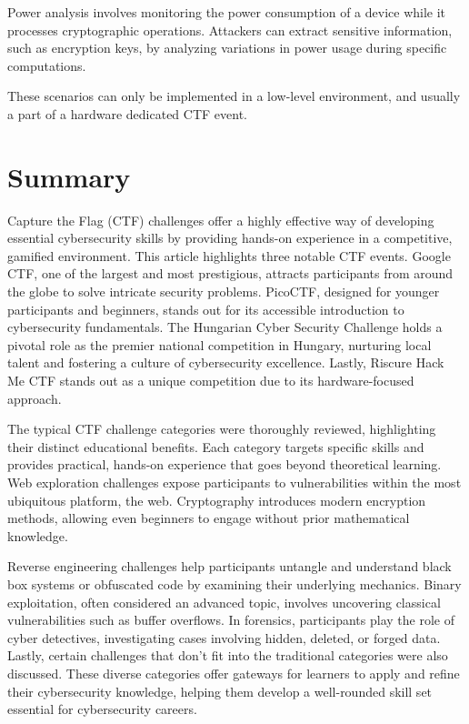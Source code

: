 \documentclass[conference]{IEEEtran}
\begin{document}
Power analysis involves monitoring the power consumption of a device while it
processes cryptographic operations. Attackers can extract sensitive
information, such as encryption keys, by analyzing variations in power usage
during specific computations.

These scenarios can only be implemented in a low-level environment, 
and usually a part of a hardware dedicated CTF event.

\section{Summary}

Capture the Flag (CTF) challenges offer a highly effective way of developing
essential cybersecurity skills by providing hands-on experience in a
competitive, gamified environment. This article highlights three notable CTF
events. Google CTF, one of the largest and most prestigious, attracts
participants from around the globe to solve intricate security problems.
PicoCTF, designed for younger participants and beginners, stands out for its
accessible introduction to cybersecurity fundamentals. The Hungarian Cyber
Security Challenge holds a pivotal role as the premier national competition in
Hungary, nurturing local talent and fostering a culture of cybersecurity
excellence. Lastly, Riscure Hack Me CTF stands out as a unique competition due
to its hardware-focused approach. 

The typical CTF challenge categories were thoroughly reviewed, highlighting
their distinct educational benefits. Each category targets specific skills and
provides practical, hands-on experience that goes beyond theoretical learning.
Web exploration challenges expose participants to
vulnerabilities within the most ubiquitous platform, the web.
Cryptography introduces modern encryption methods, allowing even beginners to
engage without prior mathematical knowledge.

Reverse engineering challenges help participants untangle and understand
black box systems or obfuscated code by examining their underlying mechanics. Binary
exploitation, often considered an advanced topic, involves uncovering classical
vulnerabilities such as buffer overflows. In forensics, participants play the
role of cyber detectives, investigating cases involving hidden, deleted, or
forged data. Lastly, certain challenges that don’t fit into the traditional
categories were also discussed. These diverse categories offer gateways for
learners to apply and refine their cybersecurity knowledge, helping them
develop a well-rounded skill set essential for cybersecurity careers.



\end{document}
